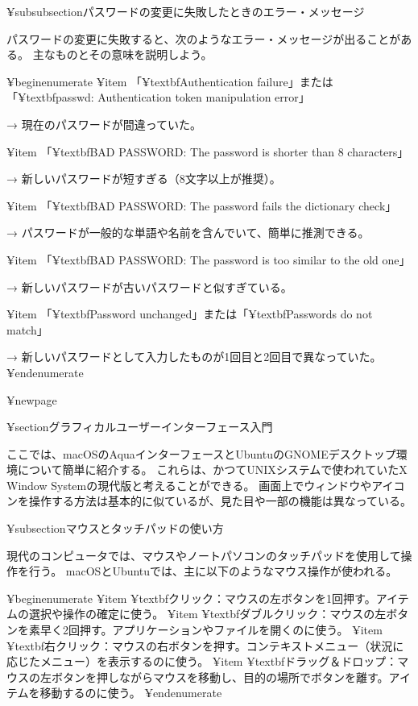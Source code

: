 ¥subsubsection{パスワードの変更に失敗したときのエラー・メッセージ}

パスワードの変更に失敗すると、次のようなエラー・メッセージが出ることがある。
主なものとその意味を説明しよう。

¥begin{enumerate}
¥item 「¥textbf{Authentication failure}」または「¥textbf{passwd: Authentication token manipulation error}」

→ 現在のパスワードが間違っていた。

¥item 「¥textbf{BAD PASSWORD: The password is shorter than 8 characters}」

→ 新しいパスワードが短すぎる（8文字以上が推奨）。

¥item 「¥textbf{BAD PASSWORD: The password fails the dictionary check}」

→ パスワードが一般的な単語や名前を含んでいて、簡単に推測できる。

¥item 「¥textbf{BAD PASSWORD: The password is too similar to the old one}」

→ 新しいパスワードが古いパスワードと似すぎている。

¥item 「¥textbf{Password unchanged}」または「¥textbf{Passwords do not match}」

→ 新しいパスワードとして入力したものが1回目と2回目で異なっていた。
¥end{enumerate}

¥newpage

¥section{グラフィカルユーザーインターフェース入門}

ここでは、macOSのAquaインターフェースとUbuntuのGNOMEデスクトップ環境について簡単に紹介する。
これらは、かつてUNIXシステムで使われていたX Window Systemの現代版と考えることができる。
画面上でウィンドウやアイコンを操作する方法は基本的に似ているが、見た目や一部の機能は異なっている。

¥subsection{マウスとタッチパッドの使い方}

現代のコンピュータでは、マウスやノートパソコンのタッチパッドを使用して操作を行う。
macOSとUbuntuでは、主に以下のようなマウス操作が使われる。

¥begin{enumerate}
¥item ¥textbf{クリック}：マウスの左ボタンを1回押す。アイテムの選択や操作の確定に使う。
¥item ¥textbf{ダブルクリック}：マウスの左ボタンを素早く2回押す。アプリケーションやファイルを開くのに使う。
¥item ¥textbf{右クリック}：マウスの右ボタンを押す。コンテキストメニュー（状況に応じたメニュー）を表示するのに使う。
¥item ¥textbf{ドラッグ＆ドロップ}：マウスの左ボタンを押しながらマウスを移動し、目的の場所でボタンを離す。アイテムを移動するのに使う。
¥end{enumerate}

